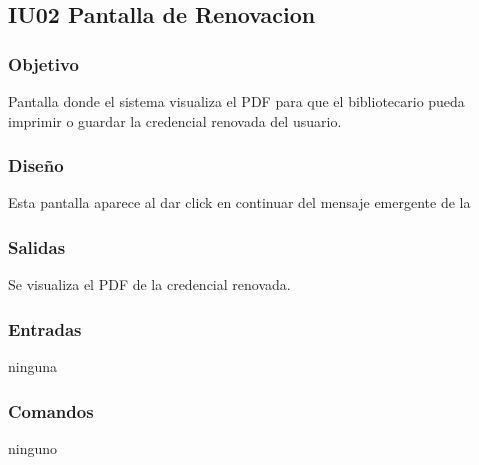 \newpage
\subsection{IU02 Pantalla de Renovacion}

\subsubsection{Objetivo}
	Pantalla donde el sistema visualiza el PDF para que el bibliotecario pueda imprimir o guardar la credencial renovada del usuario.

\subsubsection{Diseño}
	Esta pantalla aparece al dar click en continuar del mensaje emergente de la  


\subsubsection{Salidas}
	\begin{Citemize}
		\item Se visualiza el PDF de la credencial renovada.
	\end{Citemize}
	
\subsubsection{Entradas}
ninguna

\subsubsection{Comandos}
ninguno

